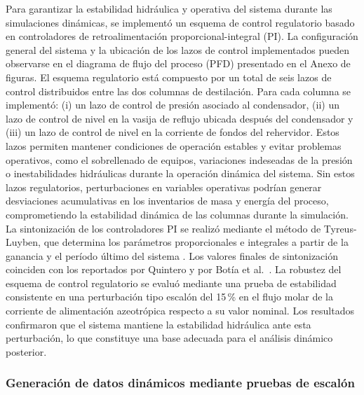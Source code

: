 Para garantizar la estabilidad hidráulica y operativa del sistema durante las simulaciones dinámicas, se implementó un esquema de control regulatorio basado en controladores de retroalimentación proporcional-integral (PI). La configuración general del sistema y la ubicación de los lazos de control implementados pueden observarse en el diagrama de flujo del proceso (PFD) presentado en el Anexo de figuras. El esquema regulatorio está compuesto por un total de seis lazos de control distribuidos entre las dos columnas de destilación. Para cada columna se implementó: (i) un lazo de control de presión asociado al condensador, (ii) un lazo de control de nivel en la vasija de reflujo ubicada después del condensador y (iii) un lazo de control de nivel en la corriente de fondos del rehervidor. Estos lazos permiten mantener condiciones de operación estables y evitar problemas operativos, como el sobrellenado de equipos, variaciones indeseadas de la presión o inestabilidades hidráulicas durante la operación dinámica del sistema. Sin estos lazos regulatorios, perturbaciones en variables operativas podrían generar desviaciones acumulativas en los inventarios de masa y energía del proceso, comprometiendo la estabilidad dinámica de las columnas durante la simulación. La sintonización de los controladores PI se realizó mediante el método de Tyreus-Luyben, que determina los parámetros proporcionales e integrales a partir de la ganancia y el período último del sistema \cite{tyreus1992}. Los valores finales de sintonización coinciden con los reportados por Quintero y por Botía et al.~\cite{ref10}. La robustez del esquema de control regulatorio se evaluó mediante una prueba de estabilidad consistente en una perturbación tipo escalón del 15\,\% en el flujo molar de la corriente de alimentación azeotrópica respecto a su valor nominal. Los resultados confirmaron que el sistema mantiene la estabilidad hidráulica ante esta perturbación, lo que constituye una base adecuada para el análisis dinámico posterior. 

\subsubsection{Generación de datos dinámicos mediante pruebas de escalón}

